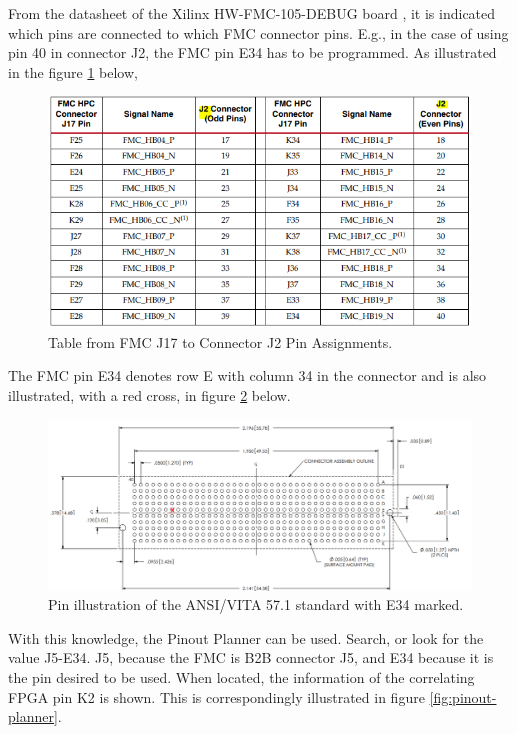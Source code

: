 \noindent From the datasheet of the Xilinx HW-FMC-105-DEBUG board \cite{ug537pdf71:online}, it is indicated which pins are connected to which FMC connector pins. E.g., in the case of using pin 40 in connector J2, the FMC pin E34 has to be programmed. As illustrated in the figure \ref{fig:FMC_pins} below, 

\begin{figure}[H]
    \centering
    \includegraphics[width=1\textwidth]{Graphics/FMC_pins.PNG}
    \caption{ Table from FMC J17 to Connector J2 Pin Assignments.}
    \label{fig:FMC_pins}
\end{figure}

\noindent The FMC pin E34 denotes row E with column 34 in the connector and is also illustrated, with a red cross, in figure \ref{fig:FMC_figure} below. 

\begin{figure}[H]
    \centering
    \includegraphics[width=1\textwidth]{Graphics/FMC_figure.PNG}
    \caption{Pin illustration of the ANSI/VITA 57.1 standard with E34 marked.}
    \label{fig:FMC_figure}
\end{figure}

\noindent With this knowledge, the Pinout Planner can be used. Search, or look for the value J5-E34. J5, because the FMC is B2B connector J5, and E34 because it is the pin desired to be used. When located, the information of the correlating FPGA pin K2 is shown. This is correspondingly illustrated in figure \ref{fig:pinout-planner}. 

